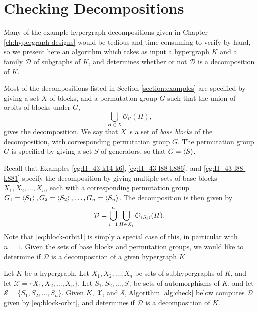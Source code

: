 \section{Checking Decompositions}

Many of the example hypergraph decompositions given in Chapter \ref{ch:hypergraph-designs} would be tedious and time-consuming to verify by hand, so we present here an algorithm which takes as input a hypergraph $K$ and a family $\mathcal{D}$ of subgraphs of $K$, and determines whether or not $\mathcal{D}$ is a decomposition of $K$.

Most of the decompositions listed in Section \ref{section:examples} are specified by giving a set $X$ of blocks, and a permutation group $G$ such that the union of orbits of blocks under $G$,
\begin{equation} \label{eq:block-orbit1}
    \bigcup_{H \in X} \mathcal{O}_G(H),
\end{equation}
gives the decomposition.
We say that $X$ is a set of {\em base blocks} of the decomposition, with corresponding permutation group $G$.
The permutation group $G$ is specified by giving a set $S$ of generators, so that $G = \left\langle S \right\rangle$.

Recall that Examples \ref{eg:H_43-k14-k6}, \ref{eg:H_43-l88-k886}, and \ref{eg:H_43-l88-k881} specify the decomposition by giving multiple sets of base blocks $X_1, X_2, \ldots, X_n$, each with a corresponding permutation group $G_1 = \left\langle S_1 \right\rangle, G_2 = \left\langle S_2 \right\rangle, \ldots, G_n = \left\langle S_n \right\rangle$.
The decomposition is then given by
\begin{equation} \label{eq:block-orbit}
    \mathcal{D} = \bigcup_{i = 1}^{n} \bigcup_{H \in X_i} \mathcal{O}_{\left\langle S_i \right\rangle}(H).
\end{equation}
Note that \eqref{eq:block-orbit1} is simply a special case of this, in particular with $n = 1$.
Given the sets of base blocks and permutation groups, we would like to determine if $\mathcal{D}$ is a decomposition of a given hypergraph $K$.

Let $K$ be a hypergraph.
Let $X_1, X_2, \ldots, X_n$ be sets of subhypergraphs of $K$, and let $\mathcal{X} = \{X_1, X_2, \ldots, X_n\}$.
Let $S_1, S_2, \ldots, S_n$ be sets of automorphisms of $K$, and let $\mathcal{S} = \{S_1, S_2, \ldots, S_n\}$.
Given $K$, $\mathcal{X}$, and $\mathcal{S}$, Algorithm \ref{alg:check} below computes $\mathcal{D}$ given by \eqref{eq:block-orbit}, and determines if $\mathcal{D}$ is a decomposition of $K$.

